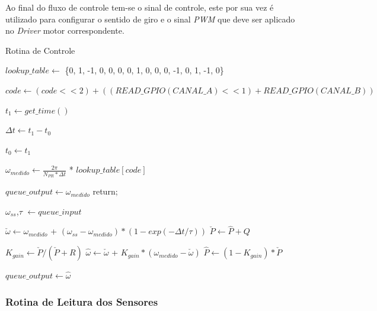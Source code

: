 Ao final do fluxo de controle tem-se o sinal de controle, este por sua vez é utilizado para configurar o sentido de giro e o sinal \emph{PWM} que deve ser aplicado no \emph{Driver} motor correspondente.

\begin{algorithm}
\caption{Rotina de Controle}
\label{alg:rotina_leitura_sensores}
\begin{algorithmic}[1]
  \State $lookup\_table \gets $ \{0, 1, -1, 0, 0, 0, 0, 1, 0, 0, 0, -1, 0, 1, -1, 0\}

  \State $code \gets (code << 2) + ((READ\_GPIO(CANAL\_A) << 1) + READ\_GPIO(CANAL\_B))$

  \State $t_1 \gets get\_time()$ 
  
  \State $\Delta{t} \gets  t_1 - t_0$
  
  \State $t_0 \gets t_1$ 
  
  \State $\omega_{medido} \gets \frac{2\pi}{N_{PR}*\Delta{t}}$ * $lookup\_table[code]$
  
   
    \State $queue\_output \gets \omega_{medido}$  
    \State return;
  \EndIf
  
  \State $\omega_{ss}$,$\tau$ $\gets  queue\_input$

  \State $\check{\omega} \gets \omega_{medido}$ + $( \omega_{ss} - \omega_{medido} ) * (1 - exp(-\Delta{t}/\tau))$
  \State $\check{P} \gets \hat{P} + Q$


  \State $K_{gain} \gets \check{P} / (\check{P} + R)$
  \State $\hat{\omega} \gets \check{\omega}$ + $K_{gain} * (\omega_{medido} - \check{\omega})$
  \State $\hat{P} \gets (1 - K_{gain}) * \check{P}$ 
  
  \State $queue\_output \gets \hat{\omega}$
\end{algorithmic}
\end{algorithm}

\subsubsection{Rotina de Leitura dos Sensores}

